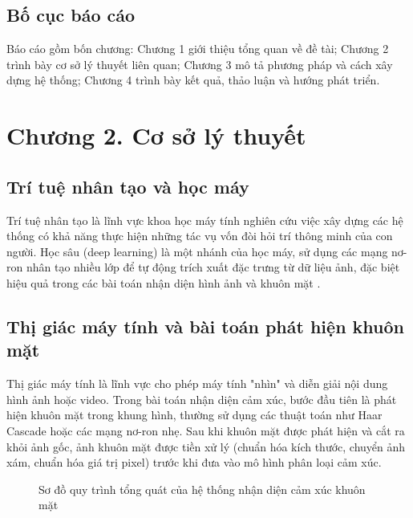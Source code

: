 \documentclass{iaesarticle}
\begin{document}
\subsection{Bố cục báo cáo}
Báo cáo gồm bốn chương: Chương 1 giới thiệu tổng quan về đề tài; Chương 2 trình bày cơ sở lý thuyết liên quan; Chương 3 mô tả phương pháp và cách xây dựng hệ thống; Chương 4 trình bày kết quả, thảo luận và hướng phát triển.

\section{Chương 2. Cơ sở lý thuyết}
\label{sec:theory}

\subsection{Trí tuệ nhân tạo và học máy}
Trí tuệ nhân tạo là lĩnh vực khoa học máy tính nghiên cứu việc xây dựng các hệ thống có khả năng thực hiện những tác vụ vốn đòi hỏi trí thông minh của con người. Học sâu (deep learning) là một nhánh của học máy, sử dụng các mạng nơ-ron nhân tạo nhiều lớp để tự động trích xuất đặc trưng từ dữ liệu ảnh, đặc biệt hiệu quả trong các bài toán nhận diện hình ảnh và khuôn mặt \citep{lecun2015, goodfellow2016}.

\subsection{Thị giác máy tính và bài toán phát hiện khuôn mặt}
Thị giác máy tính là lĩnh vực cho phép máy tính "nhìn" và diễn giải nội dung hình ảnh hoặc video. Trong bài toán nhận diện cảm xúc, bước đầu tiên là phát hiện khuôn mặt trong khung hình, thường sử dụng các thuật toán như Haar Cascade \citep{viola2001} hoặc các mạng nơ-ron nhẹ. Sau khi khuôn mặt được phát hiện và cắt ra khỏi ảnh gốc, ảnh khuôn mặt được tiền xử lý (chuẩn hóa kích thước, chuyển ảnh xám, chuẩn hóa giá trị pixel) trước khi đưa vào mô hình phân loại cảm xúc.

\begin{figure}[H]
\centering
{}
\vspace{.7em}
\caption{Sơ đồ quy trình tổng quát của hệ thống nhận diện cảm xúc khuôn mặt}
\end{figure}
\end{document}
